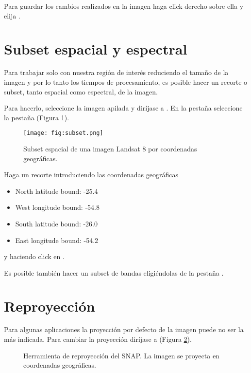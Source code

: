 Para guardar los cambios realizados en la imagen haga click derecho sobre ella y elija .

\section{Subset espacial y espectral}
Para trabajar solo con nuestra región de interés reduciendo el tamaño de la imagen y por
lo tanto los tiempos de procesamiento, es posible hacer un recorte o subset, tanto espacial como espectral, de la imagen.

Para hacerlo, seleccione la imagen apilada y diríjase a . En la pestaña  seleccione la pestaña  (Figura \ref{fig:subset}).

\begin{figure}[h!]
    \centering
    \texttt{[image: fig:subset.png]}
    \caption{Subset espacial de una imagen Landsat 8 por coordenadas geográficas.}
    \label{fig:subset}
\end{figure}

Haga un recorte introduciendo las coordenadas geográficas

\begin{itemize}
    \item North latitude bound: -25.4
    \item West longitude bound: -54.8
    \item South latitude bound: -26.0
    \item East longitude bound: -54.2
\end{itemize}

y haciendo click en .

Es posible también hacer un subset de bandas eligiéndolas de la pestaña .

\section{Reproyección}
Para algunas aplicaciones la proyección por defecto de la imagen puede no ser la más indicada. Para cambiar la proyección diríjase a  (Figura \ref{fig:repro}).

\begin{figure}[h!]
    \centering
    \hspace{1cm}
    \caption{Herramienta de reproyección del SNAP. La imagen se proyecta en coordenadas geográficas.}
    \label{fig:repro}
\end{figure}

